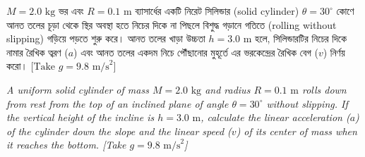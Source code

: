 \documentclass[12pt, a4paper]{article}
\begin{document}
\begin{tcolorbox}[questionbox={প্রশ্ন }19]
\noindent
$M = 2.0\text{ kg}$ ভর এবং $R = 0.1\text{ m}$ ব্যাসার্ধের একটি নিরেট সিলিন্ডার (solid cylinder) $\theta = 30^\circ$ কোণে আনত তলের চূড়া থেকে স্থির অবস্থা হতে নিচের দিকে না পিছলে বিশুদ্ধ গড়ানে গতিতে (rolling without slipping) গড়িয়ে পড়তে শুরু করে। আনত তলের খাড়া উচ্চতা $h = 3.0\text{ m}$ হলে, সিলিন্ডারটির নিচের দিকে নামার রৈখিক ত্বরণ ($a$) এবং আনত তলের একদম নিচে পৌঁছানোর মুহূর্তে এর ভরকেন্দ্রের রৈখিক বেগ ($v$) নির্ণয় করো। [$\text{Take } g = 9.8\text{ m/s}^2$]

\vspace{0.8em}
\begin{english}
\noindent\textit{\color{darkgray}
A uniform solid cylinder of mass $M = 2.0\text{ kg}$ and radius $R = 0.1\text{ m}$ rolls down from rest from the top of an inclined plane of angle $\theta = 30^\circ$ without slipping. If the vertical height of the incline is $h = 3.0\text{ m}$, calculate the linear acceleration ($a$) of the cylinder down the slope and the linear speed ($v$) of its center of mass when it reaches the bottom. [Take $g = 9.8\text{ m/s}^2$]
}
\end{english}
\end{tcolorbox}
\end{document}
